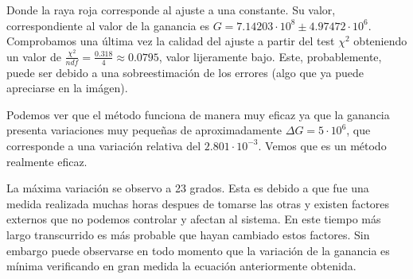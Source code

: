 Donde la raya roja corresponde al ajuste a una constante. Su valor, correspondiente al valor de la ganancia es $G=7.14203 \cdot 10^8 \pm 4.97472 \cdot 10^6$. Comprobamos una última vez la calidad del ajuste a partir del test $\chi^2$ obteniendo un valor de $\frac{\chi^2}{ndf}=\frac{0.318}{4}\approx 0.0795$, valor lijeramente bajo. Este, probablemente, puede ser debido a una sobreestimación de los errores (algo que ya puede apreciarse en la imágen).

Podemos ver que el método funciona de manera muy eficaz ya que la ganancia presenta variaciones muy pequeñas de aproximadamente $\Delta G=5 \cdot 10^6$, que corresponde a una variación relativa del $2.801 \cdot 10^{-3} $. Vemos que es un método realmente eficaz.

La máxima variación se observo a 23 grados. Esta es debido a que fue una medida realizada muchas horas despues de tomarse las otras y existen factores externos que no podemos controlar y afectan al sistema. En este tiempo más largo transcurrido es más probable que hayan cambiado estos factores. Sin embargo puede observarse en todo momento que la variación de la ganancia es mínima verificando en gran medida la ecuación anteriormente obtenida.

